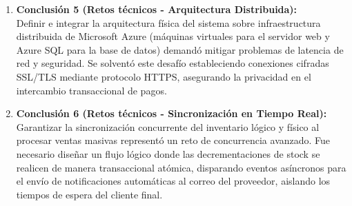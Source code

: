 \begin{enumerate}
    \item \textbf{Conclusión 5 (Retos técnicos - Arquitectura Distribuida):} \\
    Definir e integrar la arquitectura física del sistema sobre infraestructura distribuida de Microsoft Azure (máquinas virtuales para el servidor web y Azure SQL para la base de datos) demandó mitigar problemas de latencia de red y seguridad. Se solventó este desafío estableciendo conexiones cifradas SSL/TLS mediante protocolo HTTPS, asegurando la privacidad en el intercambio transaccional de pagos.
    
    \item \textbf{Conclusión 6 (Retos técnicos - Sincronización en Tiempo Real):} \\
    Garantizar la sincronización concurrente del inventario lógico y físico al procesar ventas masivas representó un reto de concurrencia avanzado. Fue necesario diseñar un flujo lógico donde las decrementaciones de stock se realicen de manera transaccional atómica, disparando eventos asíncronos para el envío de notificaciones automáticas al correo del proveedor, aislando los tiempos de espera del cliente final.
\end{enumerate}
